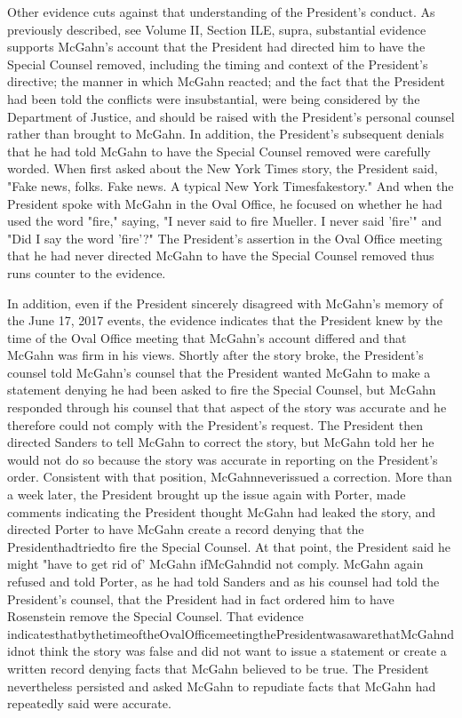 Other evidence cuts against that understanding of the President's conduct.
As previously described, see Volume II, Section ILE, supra, substantial evidence supports McGahn's account that the President had directed him to have the Special Counsel removed, including the timing and context of the President's directive;
the manner in which McGahn reacted;
and the fact that the President had been told the conflicts were insubstantial, were being considered by the Department of Justice, and should be raised with the President's personal counsel rather than brought to McGahn.
In addition, the President's subsequent denials that he had told McGahn to have the Special Counsel removed were carefully worded.
When first asked about the New York Times story, the President said, "Fake news, folks.
Fake news.
A typical New York Timesfakestory." And when the President spoke with McGahn in the Oval Office, he focused on whether he had used the word "fire," saying, "I never said to fire Mueller.
I never said 'fire'" and "Did I say the word 'fire'?" The President's assertion in the Oval Office meeting that he had never directed McGahn to have the Special Counsel removed thus runs counter to the evidence.

In addition, even if the President sincerely disagreed with McGahn's memory of the June 17, 2017 events, the evidence indicates that the President knew by the time of the Oval Office
meeting that McGahn's account differed and that McGahn was firm in his views.
Shortly after the story broke, the President's counsel told McGahn's counsel that the President wanted McGahn to make a statement denying he had been asked to fire the Special Counsel, but McGahn responded through his counsel that that aspect of the story was accurate and he therefore could not comply with the President's request.
The President then directed Sanders to tell McGahn to correct the story, but McGahn told her he would not do so because the story was accurate in reporting on the President's order.
Consistent with that position, McGahnneverissued a correction.
More than a week later, the President brought up the issue again with Porter, made comments indicating the President thought McGahn had leaked the story, and directed Porter to have McGahn create a record denying that the Presidenthadtriedto fire the Special Counsel.
At that point, the President said he might "have to get rid of' McGahn ifMcGahndid not comply.
McGahn again refused and told Porter, as he had told Sanders and as his counsel had told the President's counsel, that the President had in fact ordered him to have Rosenstein remove the Special Counsel.
That evidence indicatesthatbythetimeoftheOvalOfficemeetingthePresidentwasawarethatMcGahndidnot think the story was false and did not want to issue a statement or create a written record denying facts that McGahn believed to be true.
The President nevertheless persisted and asked McGahn to repudiate facts that McGahn had repeatedly said were accurate.

